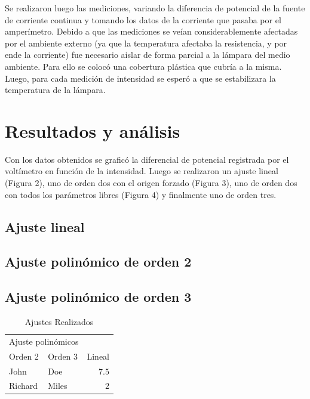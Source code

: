 \documentclass[twoside,twocolumn,a4paper]{article}
\begin{document}
Se realizaron luego las mediciones, variando la diferencia de potencial de la fuente de corriente continua y tomando los datos de la corriente que pasaba por el amper\'imetro. Debido a que las mediciones se ve\'ian considerablemente afectadas por el ambiente externo (ya que la temperatura afectaba la resistencia, y por ende la corriente) fue necesario aislar de forma parcial a la l\'ampara del medio ambiente. Para ello se coloc\'o una cobertura pl\'astica que cubr\'ia a la misma. Luego, para cada medici\'on de intensidad se esper\'o a que se estabilizara la temperatura de la l\'ampara.

\section{Resultados y an\'alisis}

Con los datos obtenidos se grafic\'o la diferencial de potencial registrada por el volt\'imetro en funci\'on de la intensidad. Luego se realizaron un ajuste lineal (Figura 2), uno de orden dos con el origen forzado (Figura 3), uno de orden dos con todos los par\'ametros libres (Figura 4) y finalmente uno de orden tres.

\subsection{Ajuste lineal}

\subsection{Ajuste polin\'omico de orden 2}

\subsection{Ajuste polin\'omico de orden 3}



\begin{table}
\caption{Ajustes Realizados}
\centering
\begin{tabular}{llr}
\toprule
\multicolumn{2}{c}{Ajuste polin\'omicos} \\
\cmidrule(r){1-2}
Orden 2 & Orden 3 & Lineal\\
\midrule
John & Doe & $7.5$ \\
Richard & Miles & $2$ \\
\bottomrule
\end{tabular}
\end{table}
\end{document}
